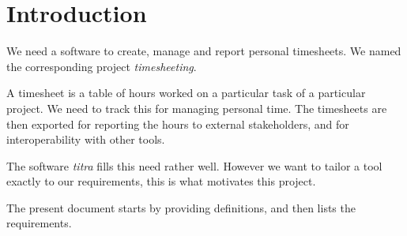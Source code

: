 \section{Introduction}
We need a software to create, manage and report personal timesheets. We named
the corresponding project \emph{timesheeting}.

A timesheet is a table of hours worked on a particular task of a particular
project. We need to track this for managing personal time. The timesheets
are then exported for reporting the hours to external stakeholders, and
for interoperability with other tools.

The software \emph{titra} \cite{titra} fills this need rather well. However
we want to tailor a tool exactly to our requirements, this is what motivates
this project.

The present document starts by providing definitions, and then lists
the requirements.